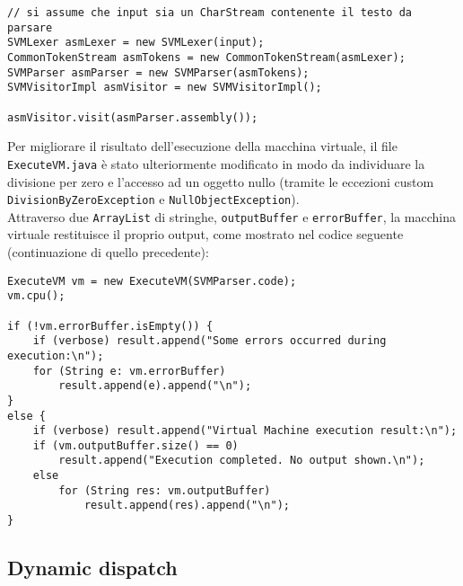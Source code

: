 \documentclass[a4paper]{article}   %
\begin{document}
\begin{lstlisting}[basicstyle=\footnotesize\ttfamily]
// si assume che input sia un CharStream contenente il testo da parsare
SVMLexer asmLexer = new SVMLexer(input);
CommonTokenStream asmTokens = new CommonTokenStream(asmLexer);
SVMParser asmParser = new SVMParser(asmTokens);
SVMVisitorImpl asmVisitor = new SVMVisitorImpl();

asmVisitor.visit(asmParser.assembly());
\end{lstlisting}
Per migliorare il risultato dell'esecuzione della macchina virtuale, il file \lstinline|ExecuteVM.java| è stato ulteriormente modificato in modo da individuare la divisione per zero e l'accesso ad un oggetto nullo (tramite le eccezioni custom \lstinline|DivisionByZeroException| e \lstinline|NullObjectException|).\\
Attraverso due \lstinline|ArrayList| di stringhe, \lstinline|outputBuffer| e \lstinline|errorBuffer|, la macchina virtuale restituisce il proprio output, come mostrato nel codice seguente (continuazione di quello precedente):
\begin{lstlisting}[basicstyle=\footnotesize\ttfamily]
ExecuteVM vm = new ExecuteVM(SVMParser.code);
vm.cpu();

if (!vm.errorBuffer.isEmpty()) {
	if (verbose) result.append("Some errors occurred during execution:\n");
	for (String e: vm.errorBuffer)
		result.append(e).append("\n");
}
else {
	if (verbose) result.append("Virtual Machine execution result:\n");
	if (vm.outputBuffer.size() == 0)
		result.append("Execution completed. No output shown.\n");
	else
		for (String res: vm.outputBuffer)
			result.append(res).append("\n");
}
\end{lstlisting}
\subsection{Dynamic dispatch}
\end{document}
